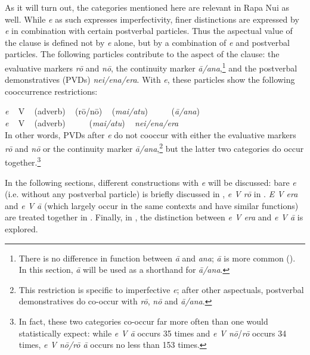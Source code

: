 As it will turn out, the categories mentioned here are relevant in Rapa Nui as well. While \textit{e} as such expresses imperfectivity, finer distinctions are expressed by \textit{e} in combination with certain postverbal particles. Thus the aspectual value of the clause is defined not by \textit{e} alone, but by a combination of \textit{e} and postverbal particles. The following particles contribute to the aspect of the clause: the evaluative markers \textit{rō} and \textit{nō}, the continuity marker \textit{{\ꞌ}ā/{\ꞌ}ana},\footnote{\label{fn:323}There is no difference in function between \textit{{\ꞌ}ā} and \textit{{\ꞌ}ana}; \textit{{\ꞌ}ā} is more common (). In this section, \textit{{\ꞌ}ā} will be used as a shorthand for \textit{{\ꞌ}ā/{\ꞌ}ana}.}  and the postverbal demonstratives (PVDs) \textit{nei/ena/era}. With \textit{e}, these particles show the following cooccurrence restrictions:

\ea\label{ex:7.26a}
\gll
\textit{e} ~ \textup{V} ~ \textup{(adverb)} ~ \textup{(}rō/nō\textup{)} ~ \textup{(}\textit{mai/atu}\textup{)} ~ ~ ~  \textup{(}\textit{{\ꞌ}ā/{\ꞌ}ana}\textup{)}\\
\textit{e} ~ V ~ \textup{(adverb)} ~ ~ ~  (\textit{mai/atu}) ~ \textit{nei/ena/era}\\
\z
In other words, PVDs after \textit{e} do not cooccur with either the evaluative markers \textit{rō} and \textit{nō} or the continuity marker \textit{{\ꞌ}ā/{\ꞌ}ana},\footnote{\label{fn:324}This restriction is specific to imperfective \textit{e}; after other aspectuals, postverbal demonstratives do co-occur with \textit{rō}, \textit{nō} and \textit{{\ꞌ}ā/{\ꞌ}ana}.} but the latter two categories do occur together.\footnote{\label{fn:325}In fact, these two categories co-occur far more often than one would statistically expect: while \textit{e V {\ꞌ}ā} occurs 35 times and \textit{e V nō}/\textit{rō} occurs 34 times, \textit{e V nō/rō {\ꞌ}ā} occurs no less than 153 times.} 

In the following sections, different constructions with \textit{e} will be discussed: bare \textit{e} (i.e. without any postverbal particle) is briefly discussed in , \textit{e V rō} in . \textit{E V era} and \textit{e V {\ꞌ}ā} (which largely occur in the same contexts and have similar functions) are treated together in . Finally, in , the distinction between \textit{e V era} and \textit{e V {\ꞌ}ā} is explored.

